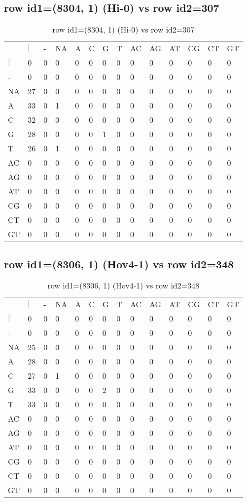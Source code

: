 \subsection{row id1=(8304, 1) (Hi-0) vs row id2=307}
\begin{center}
\begin{longtable}{|l|l|l|l|l|l|l|l|l|l|l|l|l|l|}
\caption{row id1=(8304, 1) (Hi-0) vs row id2=307} \label{table_dm292}\\
\hline
\\
\hline
&$|$&-&NA&A&C&G&T&AC&AG&AT&CG&CT&GT\\
$|$&0&0&0&0&0&0&0&0&0&0&0&0&0\\
-&0&0&0&0&0&0&0&0&0&0&0&0&0\\
NA&27&0&0&0&0&0&0&0&0&0&0&0&0\\
A&33&0&1&0&0&0&0&0&0&0&0&0&0\\
C&32&0&0&0&0&0&0&0&0&0&0&0&0\\
G&28&0&0&0&0&1&0&0&0&0&0&0&0\\
T&26&0&1&0&0&0&0&0&0&0&0&0&0\\
AC&0&0&0&0&0&0&0&0&0&0&0&0&0\\
AG&0&0&0&0&0&0&0&0&0&0&0&0&0\\
AT&0&0&0&0&0&0&0&0&0&0&0&0&0\\
CG&0&0&0&0&0&0&0&0&0&0&0&0&0\\
CT&0&0&0&0&0&0&0&0&0&0&0&0&0\\
GT&0&0&0&0&0&0&0&0&0&0&0&0&0\\
\hline
\end{longtable}
\end{center}

\subsection{row id1=(8306, 1) (Hov4-1) vs row id2=348}
\begin{center}
\begin{longtable}{|l|l|l|l|l|l|l|l|l|l|l|l|l|l|}
\caption{row id1=(8306, 1) (Hov4-1) vs row id2=348} \label{table_dm294}\\
\hline
\\
\hline
&$|$&-&NA&A&C&G&T&AC&AG&AT&CG&CT&GT\\
$|$&0&0&0&0&0&0&0&0&0&0&0&0&0\\
-&0&0&0&0&0&0&0&0&0&0&0&0&0\\
NA&25&0&0&0&0&0&0&0&0&0&0&0&0\\
A&28&0&0&0&0&0&0&0&0&0&0&0&0\\
C&27&0&1&0&0&0&0&0&0&0&0&0&0\\
G&33&0&0&0&0&2&0&0&0&0&0&0&0\\
T&33&0&0&0&0&0&0&0&0&0&0&0&0\\
AC&0&0&0&0&0&0&0&0&0&0&0&0&0\\
AG&0&0&0&0&0&0&0&0&0&0&0&0&0\\
AT&0&0&0&0&0&0&0&0&0&0&0&0&0\\
CG&0&0&0&0&0&0&0&0&0&0&0&0&0\\
CT&0&0&0&0&0&0&0&0&0&0&0&0&0\\
GT&0&0&0&0&0&0&0&0&0&0&0&0&0\\
\hline
\end{longtable}
\end{center}

